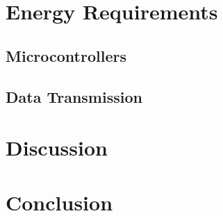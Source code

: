\chapter{Energy Requirements}
  \label{chap:energyRequirements}

  \section{Microcontrollers}

  \section{Data Transmission}
      

\chapter{Discussion}
\label{chap:part_1_discussion}

\chapter{Conclusion}
\label{chap:part_1_conclusion}